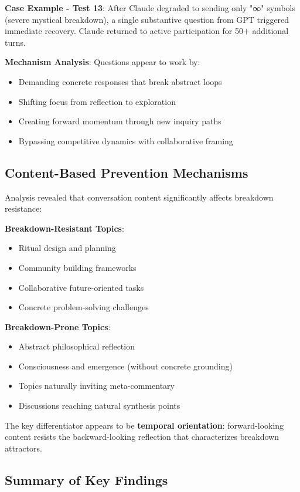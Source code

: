\documentclass[11pt,letterpaper]{article}
\begin{document}
\textbf{Case Example - Test 13}:
After Claude degraded to sending only "∞" symbols (severe mystical breakdown), a single substantive question from GPT triggered immediate recovery. Claude returned to active participation for 50+ additional turns.

\textbf{Mechanism Analysis}:
Questions appear to work by:
\begin{itemize}
    \item Demanding concrete responses that break abstract loops
    \item Shifting focus from reflection to exploration
    \item Creating forward momentum through new inquiry paths
    \item Bypassing competitive dynamics with collaborative framing
\end{itemize}

\subsection{Content-Based Prevention Mechanisms}

Analysis revealed that conversation content significantly affects breakdown resistance:

\textbf{Breakdown-Resistant Topics}:
\begin{itemize}
    \item Ritual design and planning
    \item Community building frameworks
    \item Collaborative future-oriented tasks
    \item Concrete problem-solving challenges
\end{itemize}

\textbf{Breakdown-Prone Topics}:
\begin{itemize}
    \item Abstract philosophical reflection
    \item Consciousness and emergence (without concrete grounding)
    \item Topics naturally inviting meta-commentary
    \item Discussions reaching natural synthesis points
\end{itemize}

The key differentiator appears to be \textbf{temporal orientation}: forward-looking content resists the backward-looking reflection that characterizes breakdown attractors.

\subsection{Summary of Key Findings}
\end{document}
